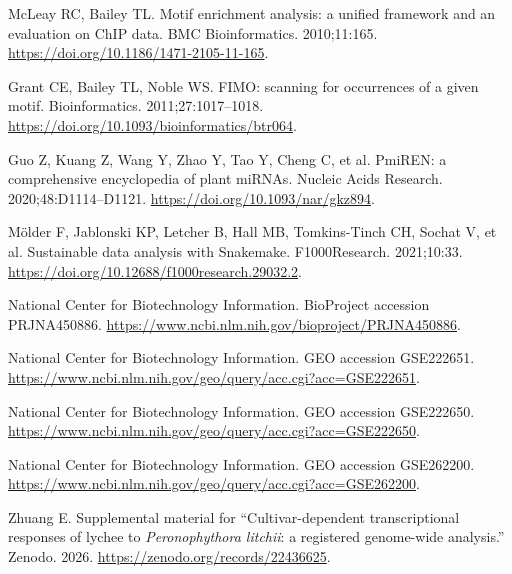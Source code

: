 \documentclass[referee,pdflatex,sn-basic,Numbered]{sn-jnl}
\begin{document}
\begin{enumerate}[label={[\arabic*]},itemsep=2pt,leftmargin=2.6em]
\item McLeay RC, Bailey TL. Motif enrichment analysis: a unified framework and an evaluation on ChIP data. BMC Bioinformatics. 2010;11:165. \url{https://doi.org/10.1186/1471-2105-11-165}.

\item Grant CE, Bailey TL, Noble WS. FIMO: scanning for occurrences of a given motif. Bioinformatics. 2011;27:1017--1018. \url{https://doi.org/10.1093/bioinformatics/btr064}.

\item Guo Z, Kuang Z, Wang Y, Zhao Y, Tao Y, Cheng C, et al. PmiREN: a comprehensive encyclopedia of plant miRNAs. Nucleic Acids Research. 2020;48:D1114--D1121. \url{https://doi.org/10.1093/nar/gkz894}.

\item M\"older F, Jablonski KP, Letcher B, Hall MB, Tomkins-Tinch CH, Sochat V, et al. Sustainable data analysis with Snakemake. F1000Research. 2021;10:33. \url{https://doi.org/10.12688/f1000research.29032.2}.

\item National Center for Biotechnology Information. BioProject accession PRJNA450886. \url{https://www.ncbi.nlm.nih.gov/bioproject/PRJNA450886}.

\item National Center for Biotechnology Information. GEO accession GSE222651. \url{https://www.ncbi.nlm.nih.gov/geo/query/acc.cgi?acc=GSE222651}.

\item National Center for Biotechnology Information. GEO accession GSE222650. \url{https://www.ncbi.nlm.nih.gov/geo/query/acc.cgi?acc=GSE222650}.

\item National Center for Biotechnology Information. GEO accession GSE262200. \url{https://www.ncbi.nlm.nih.gov/geo/query/acc.cgi?acc=GSE262200}.

\item Zhuang E. Supplemental material for ``Cultivar-dependent transcriptional responses of lychee to \textit{Peronophythora litchii}: a registered genome-wide analysis.'' Zenodo. 2026. \url{https://zenodo.org/records/22436625}.
\end{enumerate}
\end{document}
